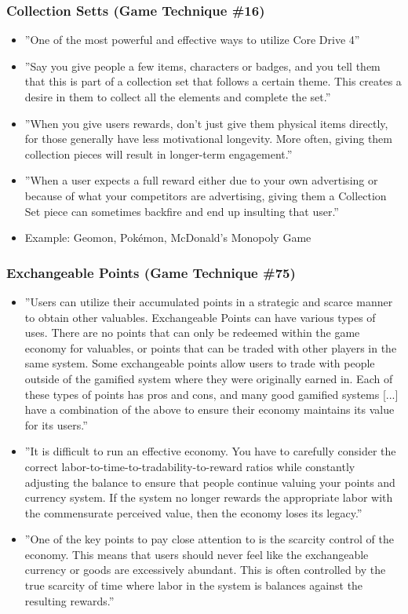 \subsubsection{Collection Setts (Game Technique \#16)}
    \begin{itemize}
        \item ''One  of the most powerful and effective ways to utilize Core Drive 4''
        \item ''Say you give people a few items, characters or badges, and you tell them that this is part of a collection set that follows a certain theme. This creates a desire in them to collect all the elements and complete the set.''
        \item ''When you give users rewards, don't just give them physical items directly, for those generally have less motivational longevity. More often, giving them collection pieces will result in longer-term engagement.''
        \item ''When a user expects a full reward either due to your own advertising or because of what your competitors are advertising, giving them a Collection Set piece can sometimes backfire and end up insulting that user.''
        \item Example: Geomon, Pokémon, McDonald's Monopoly Game
    \end{itemize}
    
\subsubsection{Exchangeable Points (Game Technique \#75)}
    \begin{itemize}
        \item ''Users can utilize their accumulated points in a strategic and scarce manner to obtain other valuables. Exchangeable Points can have various types of uses. There are no points that can only be redeemed within the game economy for valuables, or points that can be traded with other players in the same system. Some exchangeable points allow users to trade with people outside of the gamified system where they were originally earned in. Each of these types of points has pros and cons, and many good gamified systems [...] have a combination of the above to ensure their economy maintains its value for its users.''
        \item ''It is difficult to run an effective economy. You have to carefully consider the correct labor-to-time-to-tradability-to-reward ratios while constantly adjusting the balance to ensure that people continue valuing your points and currency system. If the system no longer rewards the appropriate labor with the commensurate perceived value, then the economy loses its legacy.''
        \item ''One of the key points to pay close attention to is the scarcity control of the economy. This means that users should never feel like the exchangeable currency or goods are excessively abundant. This is often controlled by the true scarcity of time where labor in the system is balances against the resulting rewards.''
    \end{itemize}
    
